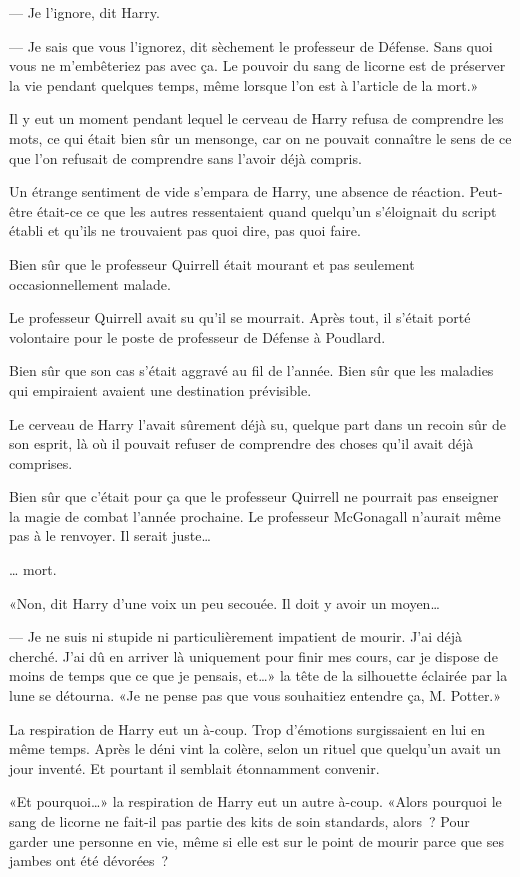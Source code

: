 --- Je l'ignore, dit Harry.

--- Je sais que vous l'ignorez, dit sèchement le professeur de Défense. Sans quoi vous ne m'embêteriez pas avec ça. Le pouvoir du sang de licorne est de préserver la vie pendant quelques temps, même lorsque l'on est à l'article de la mort.»

Il y eut un moment pendant lequel le cerveau de Harry refusa de comprendre les mots, ce qui était bien sûr un mensonge, car on ne pouvait connaître le sens de ce que l'on refusait de comprendre sans l'avoir déjà compris.

Un étrange sentiment de vide s'empara de Harry, une absence de réaction. Peut-être était-ce ce que les autres ressentaient quand quelqu'un s'éloignait du script établi et qu'ils ne trouvaient pas quoi dire, pas quoi faire.

Bien sûr que le professeur Quirrell était mourant et pas seulement occasionnellement malade.

Le professeur Quirrell avait su qu'il se mourrait. Après tout, il s'était porté volontaire pour le poste de professeur de Défense à Poudlard.

Bien sûr que son cas s'était aggravé au fil de l'année. Bien sûr que les maladies qui empiraient avaient une destination prévisible.

Le cerveau de Harry l'avait sûrement déjà su, quelque part dans un recoin sûr de son esprit, là où il pouvait refuser de comprendre des choses qu'il avait déjà comprises.

Bien sûr que c'était pour ça que le professeur Quirrell ne pourrait pas enseigner la magie de combat l'année prochaine. Le professeur McGonagall n'aurait même pas à le renvoyer. Il serait juste…

… mort.

«Non, dit Harry d'une voix un peu secouée. Il doit y avoir un moyen…

--- Je ne suis ni stupide ni particulièrement impatient de mourir. J'ai déjà cherché. J'ai dû en arriver là uniquement pour finir mes cours, car je dispose de moins de temps que ce que je pensais, et…» la tête de la silhouette éclairée par la lune se détourna. «Je ne pense pas que vous souhaitiez entendre ça, M. Potter.»

La respiration de Harry eut un à-coup. Trop d'émotions surgissaient en lui en même temps. Après le déni vint la colère, selon un rituel que quelqu'un avait un jour inventé. Et pourtant il semblait étonnamment convenir.

«Et pourquoi…» la respiration de Harry eut un autre à-coup. «Alors pourquoi le sang de licorne ne fait-il pas partie des kits de soin standards, alors~? Pour garder une personne en vie, même si elle est sur le point de mourir parce que ses jambes ont été dévorées~?

